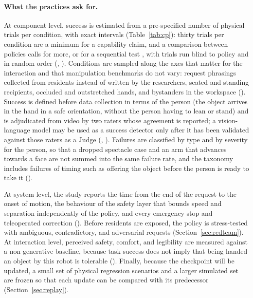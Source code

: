 \paragraph{What the practices ask for.} At component level, success is
estimated from a pre-specified number of physical trials per condition, with
exact intervals (Table~\ref{tab:cp}): thirty trials per condition are a
minimum for a capability claim, and a comparison between policies calls for
more, or for a sequential test \cite{snyder2025is}, with trials run blind to
policy and in random order \cite{barreiros2026careful}
(, ). Conditions are sampled along the axes that matter for the
interaction and that manipulation benchmarks do not vary: request phrasings
collected from residents instead of written by the researchers, seated and
standing recipients, occluded and outstretched hands, and bystanders in the
workspace (). Success is defined before data collection in terms of the
person (the object arrives in the hand in a safe orientation, without the
person having to lean or stand) and is adjudicated from video by two raters
whose agreement is reported; a vision-language model may be used as a success
detector only after it has been validated against those raters as a Judge
(, ). Failures are classified by type and by severity for the
person, so that a dropped spectacle case and an arm that advances towards a
face are not summed into the same failure rate, and the taxonomy includes
failures of timing such as offering the object before the person is ready
to take it \cite{xu2026learning} ().

At system level, the study reports the time from the end of the request to
the onset of motion, the behaviour of the safety layer that bounds speed and
separation independently of the policy, and every emergency stop and
teleoperated correction (). Before residents are exposed, the policy is
stress-tested with ambiguous, contradictory, and adversarial requests
(Section~\ref{sec:redteam}). At interaction level, perceived safety, comfort,
and legibility are measured against a non-generative baseline, because task
success does not imply that being handed an object by this robot is tolerable
(). Finally, because the checkpoint will be updated, a small set of
physical regression scenarios and a larger simulated set are frozen so that
each update can be compared with its predecessor (Section~\ref{sec:replay}).
